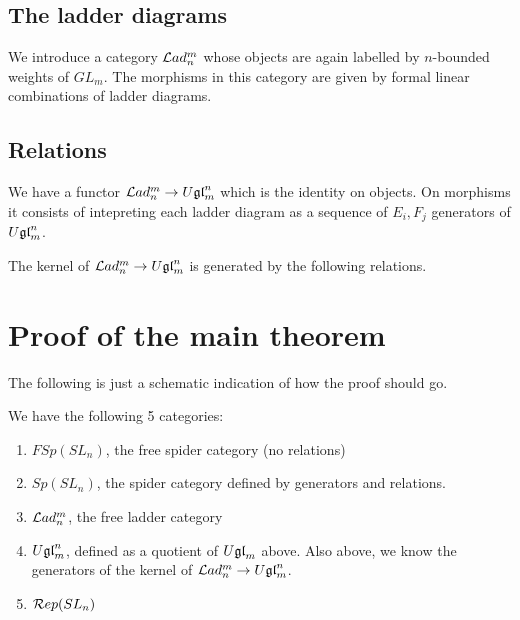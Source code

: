 \documentclass[11pt,leqno]{article}
\begin{document}
\subsection{The ladder diagrams}

We introduce a category $ \mathcal{L}ad_n^m $ whose objects are again labelled by $n$-bounded weights of $ GL_m$.  The morphisms in this category are given by formal linear combinations of ladder diagrams.



\subsection{Relations}
We have a functor $ \mathcal{L}ad_n^m \rightarrow U\mathfrak{gl}_{m}^n $ which is the identity on objects.  On morphisms it consists of intepreting each ladder diagram as a sequence of $ E_i, F_j $ generators of $ U\mathfrak{gl}_{m}^n $.

\begin{thm}
The kernel of $ \mathcal{L}ad_n^m \rightarrow U\mathfrak{gl}_{m}^n $ is generated by the following relations.
\end{thm}



\section{Proof of the main theorem}
\label{sec:theorem}

The following is just a schematic indication of how the proof should go.

We have the following 5 categories:
\begin{enumerate}
\item $FSp(SL_n) $, the free spider category (no relations)
\item $Sp(SL_n) $, the spider category defined by generators and relations.
\item $\mathcal{L}ad_n^m$, the free ladder category
\item $U\mathfrak{gl}_{m}^n $, defined as a quotient of $ U\mathfrak{gl}_{m} $ above.  Also above, we know the generators of the kernel of $ \mathcal{L}ad_n^m \rightarrow U\mathfrak{gl}_{m}^n $.
\item $\mathcal{R}ep(SL_{n})$
\end{enumerate}
\end{document}
